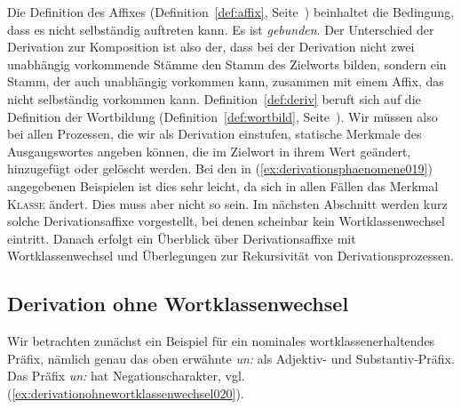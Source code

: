 Die Definition des Affixes (Definition~\ref{def:affix}, Seite~\pageref{def:affix}) beinhaltet die Bedingung, dass es nicht selbständig auftreten kann.
Es ist \textit{gebunden}.
Der Unterschied der Derivation zur Komposition ist also der, dass bei der Derivation nicht zwei unabhängig vorkommende Stämme den Stamm des Zielworts bilden, sondern ein Stamm, der auch unabhängig vorkommen kann, zusammen mit einem Affix, das nicht selbständig vorkommen kann.
Definition~\ref{def:deriv} beruft sich auf die Definition der Wortbildung (Definition~\ref{def:wortbild}, Seite~\pageref{def:wortbild}).
Wir müssen also bei allen Prozessen, die wir als Derivation einstufen, statische Merkmale des Ausgangswortes angeben können, die im Zielwort in ihrem Wert geändert, hinzugefügt oder gelöscht werden.
Bei den in (\ref{ex:derivationsphaenomene019}) angegebenen Beispielen ist dies sehr leicht, da sich in allen Fällen das Merkmal \textsc{Klasse} ändert.
Dies muss aber nicht so sein.
Im nächsten Abschnitt werden kurz solche Derivationsaffixe vorgestellt, bei denen scheinbar kein Wortklassenwechsel eintritt.
Danach erfolgt ein Überblick über Derivationsaffixe mit Wortklassenwechsel und Überlegungen zur Rekursivität von Derivationsprozessen.

\subsection{Derivation ohne Wortklassenwechsel}
\label{sec:derivationohnewortklassenwechsel}


Wir betrachten zunächst ein Beispiel für ein nominales wortklassenerhaltendes Präfix, nämlich genau das oben erwähnte \textit{un:} als Adjektiv- und Substantiv-Präfix.
Das Präfix \textit{un:} hat Negationscharakter, vgl. (\ref{ex:derivationohnewortklassenwechsel020}).

\begin{exe}
  \ex\label{ex:derivationohnewortklassenwechsel020}
  \begin{xlist}
  \end{xlist}
\end{exe}

